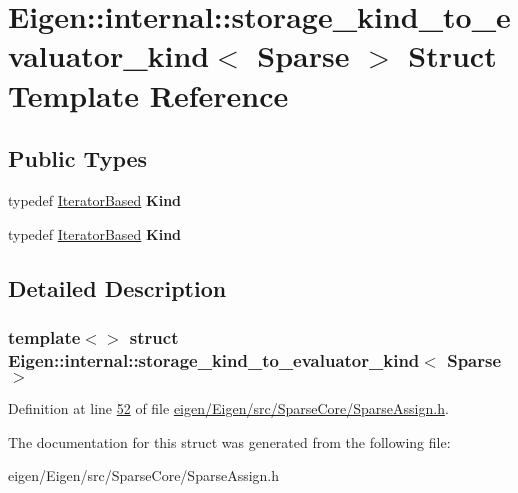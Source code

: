 \hypertarget{struct_eigen_1_1internal_1_1storage__kind__to__evaluator__kind_3_01_sparse_01_4}{}\section{Eigen\+:\+:internal\+:\+:storage\+\_\+kind\+\_\+to\+\_\+evaluator\+\_\+kind$<$ Sparse $>$ Struct Template Reference}
\label{struct_eigen_1_1internal_1_1storage__kind__to__evaluator__kind_3_01_sparse_01_4}
\subsection*{Public Types}
\begin{DoxyCompactItemize}
\item 
\mbox{\label{struct_eigen_1_1internal_1_1storage__kind__to__evaluator__kind_3_01_sparse_01_4_af851f49773d93da13d7f47cf5b97e65b}} 
typedef \hyperlink{struct_eigen_1_1internal_1_1_iterator_based}{Iterator\+Based} {\bfseries Kind}
\item 
\mbox{\label{struct_eigen_1_1internal_1_1storage__kind__to__evaluator__kind_3_01_sparse_01_4_af851f49773d93da13d7f47cf5b97e65b}} 
typedef \hyperlink{struct_eigen_1_1internal_1_1_iterator_based}{Iterator\+Based} {\bfseries Kind}
\end{DoxyCompactItemize}


\subsection{Detailed Description}
\subsubsection*{template$<$$>$\newline
struct Eigen\+::internal\+::storage\+\_\+kind\+\_\+to\+\_\+evaluator\+\_\+kind$<$ Sparse $>$}



Definition at line \hyperlink{eigen_2_eigen_2src_2_sparse_core_2_sparse_assign_8h_source_l00052}{52} of file \hyperlink{eigen_2_eigen_2src_2_sparse_core_2_sparse_assign_8h_source}{eigen/\+Eigen/src/\+Sparse\+Core/\+Sparse\+Assign.\+h}.



The documentation for this struct was generated from the following file\+:\begin{DoxyCompactItemize}
\item 
eigen/\+Eigen/src/\+Sparse\+Core/\+Sparse\+Assign.\+h\end{DoxyCompactItemize}
